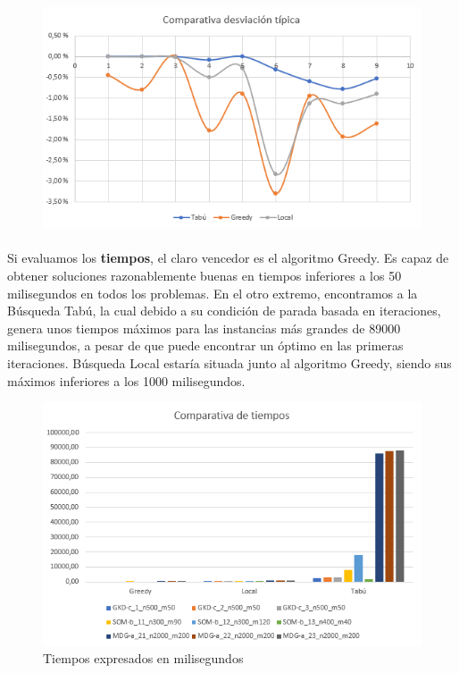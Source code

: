 \documentclass{article}
\begin{document}
	\begin{figure}[H]
		
		\centering
		\includegraphics[scale=0.4]{img/DTGlobal}
		
	\end{figure}
	
	\paragraph{}Si evaluamos los \textbf{tiempos}, el claro vencedor es el algoritmo Greedy. Es capaz de obtener soluciones razonablemente buenas en tiempos inferiores a los 50 milisegundos en todos los problemas. En el otro extremo, encontramos a la Búsqueda Tabú, la cual debido a su condición de parada basada en iteraciones, genera unos tiempos máximos para las instancias más grandes de 89000 milisegundos, a pesar de que puede encontrar un óptimo en las primeras iteraciones. Búsqueda Local estaría situada junto al algoritmo Greedy, siendo sus máximos inferiores a los 1000 milisegundos.
	
	\begin{figure}[H]
		
		\centering
		\includegraphics[scale=0.4]{img/TiemposGlobal}
		\caption{Tiempos expresados en milisegundos}
		
	\end{figure}
	
\end{document}

